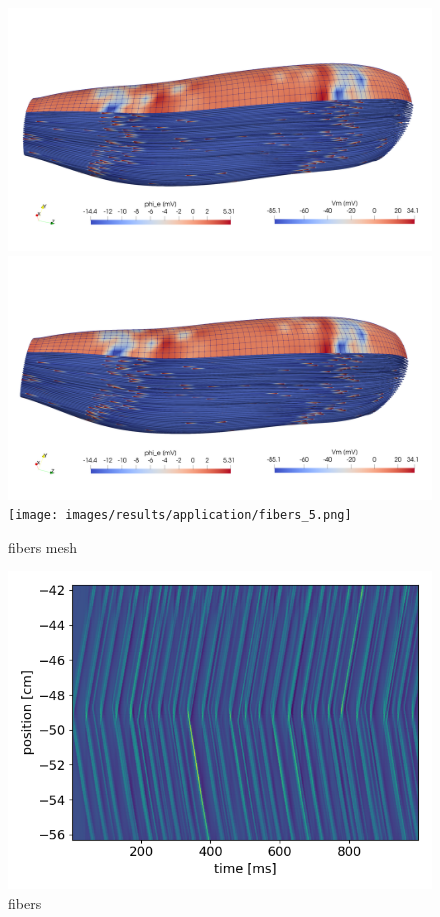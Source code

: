 \begin{figure}[H]
  \centering%
  \includegraphics[width=\textwidth]{images/results/application/fibers_3.png}%
  \includegraphics[width=\textwidth]{images/results/application/fibers_4.png}%
  \texttt{[image: images/results/application/fibers\_5.png]}%
  \caption{fibers mesh}%
  \label{fig:multidomain_mesh}%
\end{figure}


\begin{figure}[H]
  \centering%
  \includegraphics[width=\textwidth]{images/results/application/fibers_plot.png}%
  \caption{fibers}%
  \label{fig:fibers_plot}%
\end{figure}

